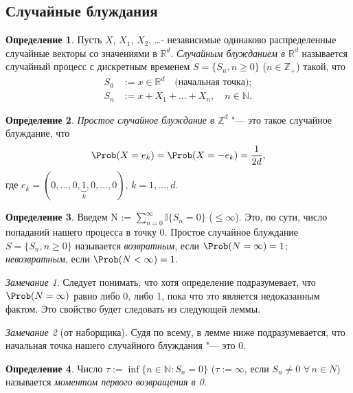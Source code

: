 \documentclass[a4paper]{article}
\newcommand{\ind}{\mathbb I}
\theoremstyle{plain}
\theoremstyle{definition}
\newtheorem{defn}{Определение}[section]
\theoremstyle{remark}
\newtheorem*{rem}{Замечание}
\begin{document}
\subsection{Случайные блуждания}

\begin{defn}
  Пусть $X$, $X_{1}$, $X_{2}$, \ldots - независимые одинаково распределенные случайные векторы со значениями в $\mathbb{R}^{d}$. \emph{Случайным блужданием в $\mathbb{R}^{d}$} называется случайный процесс с дискретным временем $S = \lbrace S_{n}, n \geqslant 0 \rbrace$ ($n \in \mathbb{Z}_{+}$) такой, что
  \begin{align*}
    S_{0} &:= x \in \mathbb{R}^{d} \quad\text{(начальная точка)};\\
    S_{n} &:= x + X_{1} + \ldots + X_{n}, \quad n \in \mathbb{N}.
  \end{align*}
\end{defn}

\begin{defn}
  \emph{Простое случайное блуждание в $\mathbb{Z}^{d}$} "--- это такое случайное блуждание, что
  \begin{equation*}
    \Prob(X = e_{k}) = \Prob(X = -e_{k}) = \frac{1}{2d},
  \end{equation*}
  где $e_{k} = (0, \ldots, 0, \underbrace{1}_{k}, 0, \ldots, 0)$, $k = 1, \ldots, d$.
\end{defn}

\begin{defn}
  Введем N := $\sum\limits_{n=0}^\infty \ind \lbrace S_{n} = 0 \rbrace$ ($\leqslant \infty$). Это, по сути, число попаданий нашего процесса в точку 0. Простое случайное блуждание $S = \lbrace S_{n}, n \geqslant 0\rbrace$ называется \emph{возвратным}, если $\Prob(N = \infty) = 1$; \emph{невозвратным}, если $\Prob(N < \infty) = 1$.
\end{defn}

\begin{rem}
  Следует понимать, что хотя определение подразумевает, что $\Prob(N = \infty)$ равно либо 0, либо 1, пока что это является недоказанным фактом. Это свойство будет следовать из следующей леммы.
\end{rem}

\begin{rem}[от наборщика]
  Судя по всему, в лемме ниже подразумевается, что начальная точка нашего случайного блуждания "--- это 0.
\end{rem}
\begin{defn}
  Число $\tau := \inf\lbrace n \in \mathbb{N} : S_{n} = 0 \rbrace$ ($\tau := \infty$, если $S_{n} \neq 0$ $\forall\, n \in N$) называется \emph{моментом первого возвращения в 0}.
\end{defn}
\end{document}
